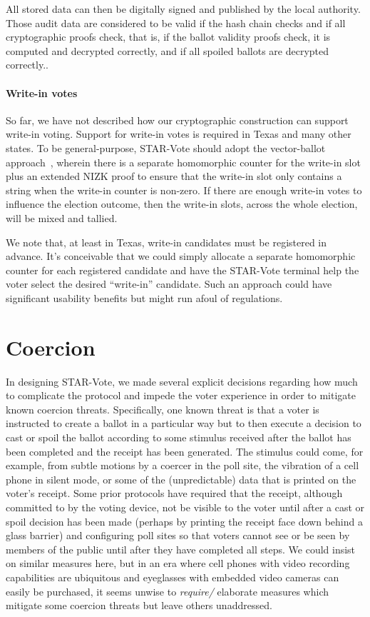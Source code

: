 \documentclass[letterpaper, 10pt, twocolumn]{article}
\newcommand{\projname}{STAR-Vote\xspace}
\begin{document}
All stored data can then be digitally signed and published by the
local authority. Those audit data are considered to be valid if the
hash chain checks and if all cryptographic proofs check, that is, if
the ballot validity proofs check, it  is computed and decrypted
correctly, and if all spoiled ballots are decrypted correctly..

\paragraph{Write-in votes}
So far, we have not described how our cryptographic construction can
support write-in voting. Support for write-in votes is required in Texas
and many other states. To be general-purpose, \projname should adopt
the vector-ballot approach~\cite{kiayias04vectorBallot}, wherein there
is a separate homomorphic counter for the write-in slot plus
an extended NIZK proof to ensure that the write-in slot only contains
a string when the write-in counter is non-zero. If there are enough
write-in votes to influence the election outcome, then the write-in slots, across the whole
election, will be mixed and tallied.

We note that, at least in Texas, write-in candidates must be
registered in advance. It's conceivable that we could simply allocate
a separate homomorphic counter for each registered candidate and have
the \projname terminal help the voter select the desired ``write-in''
candidate. Such an approach could have significant usability benefits
but might run afoul of regulations.






\section{Coercion}

\label{sec:coercion}

In designing \projname, we made several explicit decisions regarding how much to complicate the protocol and impede the voter experience in order to mitigate known coercion threats.  Specifically, one known threat is that a voter is instructed to create a ballot in a particular way but to then execute a decision to cast or spoil the ballot according to some stimulus received after the ballot has been completed and the receipt has been generated.  The stimulus could come, for example, from subtle motions by a coercer in the poll site, the vibration of a cell phone in silent mode, or some of the (unpredictable) data that is printed on the voter’s receipt.  Some prior protocols have required that the receipt, although committed to by the voting device, not be visible to the voter until after a cast or spoil decision has been made (perhaps by printing the receipt face down behind a glass barrier) and configuring poll sites so that voters cannot see or be seen by members of the public until after they have completed all steps.  We could insist on similar measures here, but in an era where cell phones with video recording capabilities are ubiquitous and eyeglasses with embedded video cameras can easily be purchased, it seems unwise to {\em require/} elaborate measures which mitigate some coercion threats but leave others unaddressed.
\end{document}
